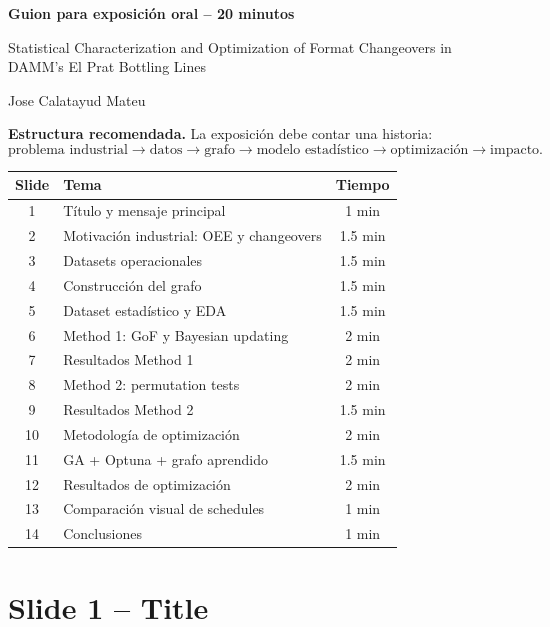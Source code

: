 \documentclass[11pt,a4paper]{article}
\newcommand{\slide}[1]{\newpage\section*{#1}}
\begin{document}
\begin{center}
{\LARGE\bfseries Guion para exposici\'on oral -- 20 minutos\par}
\vspace{0.3cm}
{\large Statistical Characterization and Optimization of Format Changeovers in DAMM's El Prat Bottling Lines\par}
\vspace{0.2cm}
{\large Jose Calatayud Mateu\par}
\end{center}

\vspace{0.4cm}

\textbf{Estructura recomendada.} La exposici\'on debe contar una historia:
\[
\text{problema industrial}
\rightarrow
\text{datos}
\rightarrow
\text{grafo}
\rightarrow
\text{modelo estad\'istico}
\rightarrow
\text{optimizaci\'on}
\rightarrow
\text{impacto}.
\]

\begin{table}[H]\centering
\begin{tabular}{@{}clc@{}}
\toprule
Slide & Tema & Tiempo \\
\midrule
1 & T\'itulo y mensaje principal & 1 min \\
2 & Motivaci\'on industrial: OEE y changeovers & 1.5 min \\
3 & Datasets operacionales & 1.5 min \\
4 & Construcci\'on del grafo & 1.5 min \\
5 & Dataset estad\'istico y EDA & 1.5 min \\
6 & Method 1: GoF y Bayesian updating & 2 min \\
7 & Resultados Method 1 & 2 min \\
8 & Method 2: permutation tests & 2 min \\
9 & Resultados Method 2 & 1.5 min \\
10 & Metodolog\'ia de optimizaci\'on & 2 min \\
11 & GA + Optuna + grafo aprendido & 1.5 min \\
12 & Resultados de optimizaci\'on & 2 min \\
13 & Comparaci\'on visual de schedules & 1 min \\
14 & Conclusiones & 1 min \\
\bottomrule
\end{tabular}
\end{table}

\slide{Slide 1 -- Title}
\end{document}
